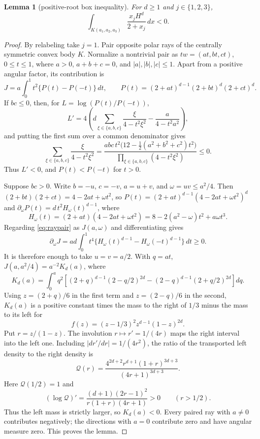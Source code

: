 \documentclass[11pt]{amsart}
\newtheorem{lemma}[theorem]{Lemma}
\theoremstyle{definition}
\theoremstyle{remark}
\begin{document}
\begin{lemma}[positive-root box inequality]\label{lem:positive-box}
For $d\ge1$ and $j\in\{1,2,3\}$,
\[
 \int_{K(a_1,a_2,a_3)}\frac{x_jH^d}{2+x_j}\,dx<0.
\]
\end{lemma}

\begin{proof}
By relabeling take $j=1$. Pair opposite polar rays of the centrally
symmetric convex body $K$. Normalize a nontrivial pair as
$tw=(at,bt,ct)$, $0\le t\le1$, where $a>0$, $a+b+c=0$, and
$|a|,|b|,|c|\le1$. Apart from a positive angular factor, its contribution is
\begin{equation}\label{eq:raypair}
 J=a\int_0^1t^2\{P(t)-P(-t)\}\,dt,\qquad
 P(t)=(2+at)^{d-1}(2+bt)^d(2+ct)^d.
\end{equation}
If $bc\le0$, then, for $L=\log(P(t)/P(-t))$,
\[
 L'=4\left(d\sum_{\xi\in\{a,b,c\}}
       \frac{\xi}{4-t^2\xi^2}-\frac{a}{4-t^2a^2}\right),
\]
and putting the first sum over a common denominator gives
\[
 \sum_{\xi\in\{a,b,c\}}\frac{\xi}{4-t^2\xi^2}
 =\frac{abc\,t^2\bigl(12-\tfrac12(a^2+b^2+c^2)t^2\bigr)}
        {\prod_{\xi\in\{a,b,c\}}(4-t^2\xi^2)}\le0.
\]
Thus $L'<0$, and $P(t)<P(-t)$ for $t>0$.

Suppose $bc>0$. Write $b=-u$, $c=-v$, $a=u+v$, and
$\omega=uv\le a^2/4$. Then $(2+bt)(2+ct)=4-2at+\omega t^2$, so
$P(t)=(2+at)^{d-1}(4-2at+\omega t^2)^d$ and
$\partial_\omega P(t)=d\,t^2H_\omega(t)^{d-1}$, where
\[
 H_\omega(t)=(2+at)(4-2at+\omega t^2)=8-2(a^2-\omega)t^2+a\omega t^3.
\]
Regarding \eqref{eq:raypair} as $J(a,\omega)$ and differentiating gives
\[
 \partial_\omega J
 =ad\int_0^1t^4\{H_\omega(t)^{d-1}-H_\omega(-t)^{d-1}\}\,dt\ge0.
\]
It is therefore enough to take $u=v=a/2$. With $q=at$,
$J(a,a^2/4)=a^{-2}K_d(a)$, where
\[
 K_d(a)=\int_0^a q^2\left[(2+q)^{d-1}(2-q/2)^{2d}
              -(2-q)^{d-1}(2+q/2)^{2d}\right]dq.
\]
Using $z=(2+q)/6$ in the first term and $z=(2-q)/6$ in the second,
$K_d(a)$ is a positive constant times the mass to the right of $1/3$
minus the mass to its left for
\[
 f(z)=(z-1/3)^2z^{d-1}(1-z)^{2d}.
\]
Put $r=z/(1-z)$. The involution $r\mapsto r'=1/(4r)$ maps the right
interval into the left one. Including $|dr'/dr|=1/(4r^2)$, the ratio of
the transported left density to the right density is
\[
 \mathcal Q(r)=
 \frac{4^{2d+2}r^{d+1}(1+r)^{3d+3}}{(4r+1)^{3d+3}}.
\]
Here $\mathcal Q(1/2)=1$ and
\[
 (\log\mathcal Q)'=
 \frac{(d+1)(2r-1)^2}{r(1+r)(4r+1)}>0\qquad(r>1/2).
\]
Thus the left mass is strictly larger, so $K_d(a)<0$. Every paired ray
with $a\ne0$ contributes negatively; the directions with $a=0$ contribute
zero and have angular measure zero. This proves the lemma.
\end{proof}
\end{document}
